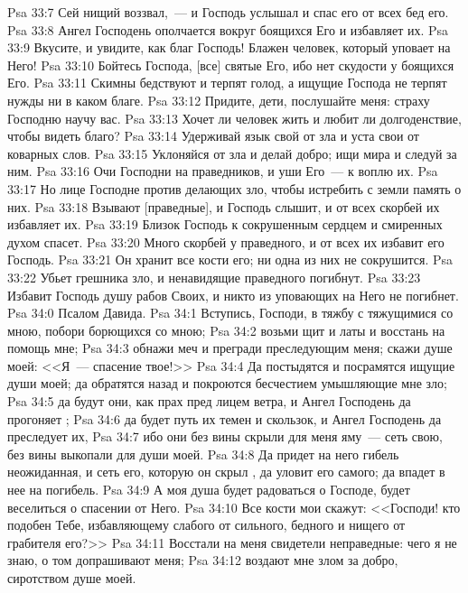 \vs Psa 33:7 Сей нищий воззвал,~--- и Господь услышал и спас его от всех бед его.
\vs Psa 33:8 Ангел Господень ополчается вокруг боящихся Его и избавляет их.
\vs Psa 33:9 Вкусите, и увидите, как благ Господь! Блажен человек, который уповает на Него!
\vs Psa 33:10 Бойтесь Господа, [все] святые Его, ибо нет скудости у боящихся Его.
\vs Psa 33:11 Скимны бедствуют и терпят голод, а ищущие Господа не терпят нужды ни в каком благе.
\vs Psa 33:12 Придите, дети, послушайте меня: страху Господню научу вас.
\vs Psa 33:13 Хочет ли человек жить и любит ли долгоденствие, чтобы видеть благо?
\vs Psa 33:14 Удерживай язык свой от зла и уста свои от коварных слов.
\vs Psa 33:15 Уклоняйся от зла и делай добро; ищи мира и следуй за ним.
\vs Psa 33:16 Очи Господни  на праведников, и уши Его~--- к воплю их.
\vs Psa 33:17 Но лице Господне против делающих зло, чтобы истребить с земли память о них.
\vs Psa 33:18 Взывают [праведные], и Господь слышит, и от всех скорбей их избавляет их.
\vs Psa 33:19 Близок Господь к сокрушенным сердцем и смиренных духом спасет.
\vs Psa 33:20 Много скорбей у праведного, и от всех их избавит его Господь.
\vs Psa 33:21 Он хранит все кости его; ни одна из них не сокрушится.
\vs Psa 33:22 Убьет грешника зло, и ненавидящие праведного погибнут.
\vs Psa 33:23 Избавит Господь душу рабов Своих, и никто из уповающих на Него не погибнет.
\vs Psa 34:0 Псалом Давида.
\rsbpar\vs Psa 34:1 Вступись, Господи, в тяжбу с тяжущимися со мною, побори борющихся со мною;
\vs Psa 34:2 возьми щит и латы и восстань на помощь мне;
\vs Psa 34:3 обнажи меч и прегради  преследующим меня; скажи душе моей: <<Я~--- спасение твое!>>
\vs Psa 34:4 Да постыдятся и посрамятся ищущие души моей; да обратятся назад и покроются бесчестием умышляющие мне зло;
\vs Psa 34:5 да будут они, как прах пред лицем ветра, и Ангел Господень да прогоняет ;
\vs Psa 34:6 да будет путь их темен и скользок, и Ангел Господень да преследует их,
\vs Psa 34:7 ибо они без вины скрыли для меня яму~--- сеть свою, без вины выкопали  для души моей.
\vs Psa 34:8 Да придет на него гибель неожиданная, и сеть его, которую он скрыл , да уловит его самого; да впадет в нее на погибель.
\vs Psa 34:9 А моя душа будет радоваться о Господе, будет веселиться о спасении от Него.
\vs Psa 34:10 Все кости мои скажут: <<Господи! кто подобен Тебе, избавляющему слабого от сильного, бедного и нищего от грабителя его?>>
\vs Psa 34:11 Восстали на меня свидетели неправедные: чего я не знаю, о том допрашивают меня;
\vs Psa 34:12 воздают мне злом за добро, сиротством душе моей.
